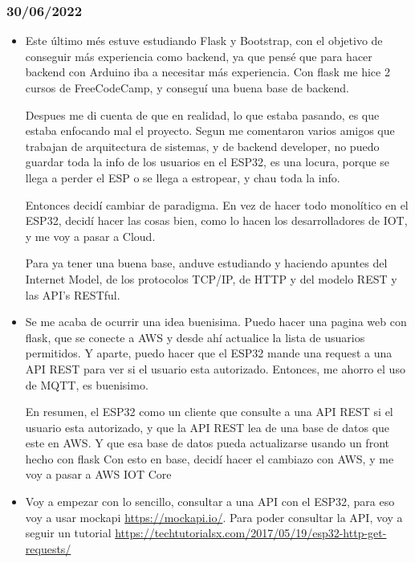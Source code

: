 \documentclass[../informe_krapp.tex]{subfiles}
\begin{document}
\subsubsection*{30/06/2022}
\begin{itemize}
	\item Este último més estuve estudiando Flask y Bootstrap, con el objetivo de conseguir más experiencia como backend,
	      ya que pensé que para hacer backend con Arduino iba a necesitar más experiencia. Con flask me hice 2 cursos de FreeCodeCamp,
	      y conseguí una buena base de backend.

	      Despues me di cuenta de que en realidad, lo que estaba pasando, es que estaba enfocando mal el proyecto.
	      Segun me comentaron varios amigos que trabajan de arquitectura de sistemas, y de backend developer, no
	      puedo guardar toda la info de los usuarios en el ESP32, es una locura, porque se llega a perder el ESP o
	      se llega a estropear, y chau toda la info.

	      Entonces decidí cambiar de paradigma. En vez de hacer todo monolítico en el ESP32, decidí hacer las cosas
	      bien, como lo hacen los desarrolladores de IOT, y me voy a pasar a Cloud.

	      Para ya tener una buena base, anduve estudiando y haciendo apuntes del Internet Model,
	      de los protocolos TCP/IP, de HTTP y del modelo REST y las API's RESTful.

	\item Se me acaba de ocurrir una idea buenisima. Puedo hacer una pagina web con flask, que se conecte
	      a AWS y desde ahí actualice la lista de usuarios permitidos. Y aparte, puedo hacer que el ESP32 mande una request
	      a una API REST para ver si el usuario esta autorizado. Entonces, me ahorro el uso de MQTT, es buenisimo.

	      En resumen, el ESP32 como un cliente que consulte a una API REST si el usuario esta autorizado, y que la API REST lea
	      de una base de datos que este en AWS. Y que esa base de datos pueda actualizarse usando un front hecho con flask
	      Con esto en base, decidí hacer el cambiazo con AWS, y me voy a pasar a AWS IOT Core

	\item Voy a empezar con lo sencillo, consultar a una API con el ESP32, para eso voy a usar mockapi
	      \url{https://mockapi.io/}. Para poder consultar la API, voy a seguir un tutorial
	      \url{https://techtutorialsx.com/2017/05/19/esp32-http-get-requests/}
\end{itemize}
\end{document}
